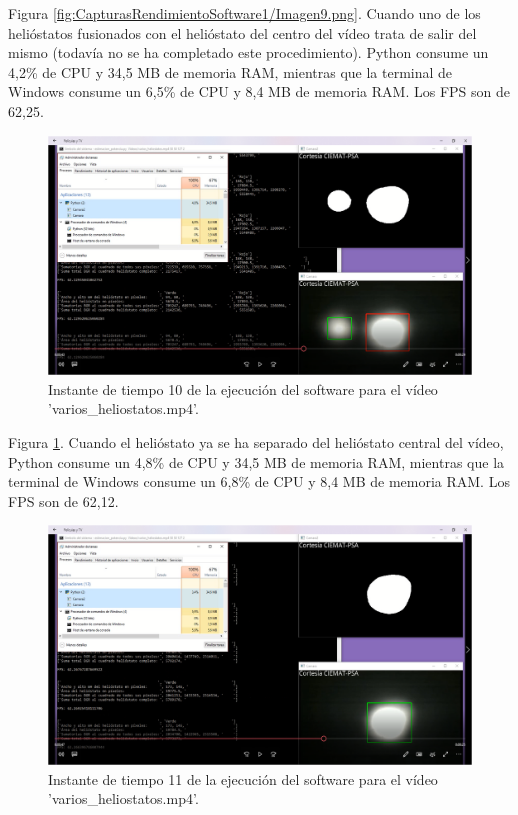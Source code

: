 Figura \ref{fig:CapturasRendimientoSoftware1/Imagen9.png}. Cuando uno de los helióstatos fusionados con el helióstato del centro del vídeo trata de salir del mismo (todavía no se ha completado este procedimiento). Python consume un 4,2\% de CPU y 34,5 MB de memoria RAM, mientras que la terminal de Windows consume un 6,5\% de CPU y 8,4 MB de memoria RAM. Los FPS son de 62,25.\\[20pt]

\begin{figure}[h!]
  	\centering
	\includegraphics[width=\textwidth]{CapturasRendimientoSoftware1/Imagen10.png}
	\caption{Instante de tiempo 10 de la ejecución del software para el vídeo 'varios\_heliostatos.mp4'.
	\label{fig:CapturasRendimientoSoftware1/Imagen10.png}}
\end{figure}

Figura \ref{fig:CapturasRendimientoSoftware1/Imagen10.png}. Cuando el helióstato ya se ha separado del helióstato central del vídeo, Python consume un 4,8\% de CPU y 34,5 MB de memoria RAM, mientras que la terminal de Windows consume un 6,8\% de CPU y 8,4 MB de memoria RAM. Los FPS son de 62,12.\\[20pt]

\begin{figure}[h!]
  	\centering
	\includegraphics[width=\textwidth]{CapturasRendimientoSoftware1/Imagen11.png}
	\caption{Instante de tiempo 11 de la ejecución del software para el vídeo 'varios\_heliostatos.mp4'.
	\label{fig:CapturasRendimientoSoftware1/Imagen11.png}}
\end{figure}

